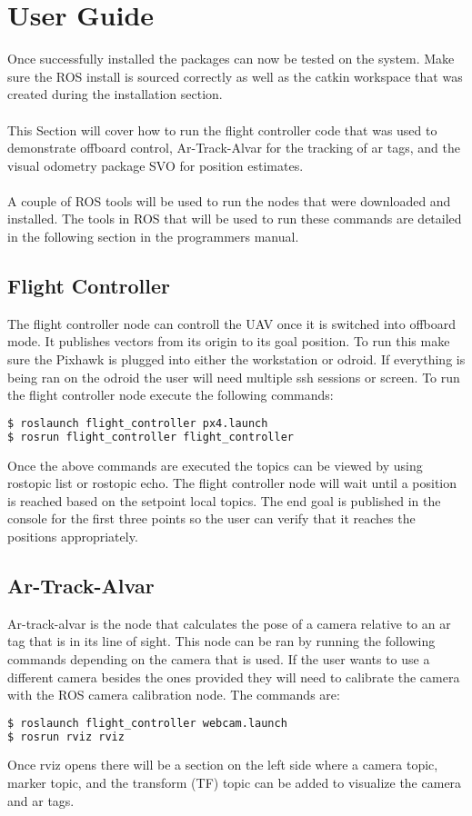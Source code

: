 \section{User Guide}
Once successfully installed the packages can now be tested on the system. Make sure the ROS install is sourced correctly as well as the catkin workspace that was created during the installation section.\\
\\
This Section will cover how to run the flight controller code that was used to demonstrate offboard control, Ar-Track-Alvar for the tracking of ar tags, and the visual odometry package SVO for position estimates.\\
\\
A couple of ROS tools will be used to run the nodes that were downloaded and installed. The tools in ROS that will be used to run these commands are detailed in the following section in the programmers manual.

\subsection{Flight Controller}
The flight controller node can controll the UAV once it is switched into offboard mode. It publishes vectors from its origin to its goal position. To run this make sure the Pixhawk is plugged into either the workstation or odroid. If everything is being ran on the odroid the user will need multiple ssh sessions or screen. To run the flight controller node execute the following commands:
\begin{lstlisting}[language=bash]
$ roslaunch flight_controller px4.launch
$ rosrun flight_controller flight_controller
\end{lstlisting}
Once the above commands are executed the topics can be viewed by using rostopic list or rostopic echo. The flight controller node will wait until a position is reached based on the setpoint local topics. The end goal is published in the console for the first three points so the user can verify that it reaches the positions appropriately. 
\subsection{Ar-Track-Alvar}
Ar-track-alvar is the node that calculates the pose of a camera relative to an ar tag that is in its line of sight. This node can be ran by running the following commands depending on the camera that is used. If the user wants to use a different camera besides the ones provided they will need to calibrate the camera with the ROS camera calibration node. The commands are:
\begin{lstlisting}[language=bash]
$ roslaunch flight_controller webcam.launch
$ rosrun rviz rviz
\end{lstlisting}
Once rviz opens there will be a section on the left side where a camera topic, marker topic, and the transform (TF) topic can be added to visualize the camera and ar tags.
